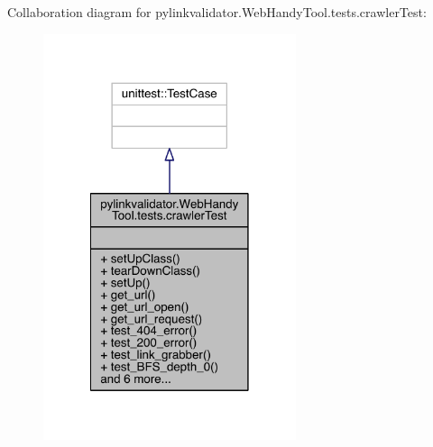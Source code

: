 Collaboration diagram for pylinkvalidator.\+Web\+Handy\+Tool.\+tests.\+crawler\+Test\+:
\nopagebreak
\begin{figure}[H]
\begin{center}
\leavevmode
\includegraphics[width=210pt]{classpylinkvalidator_1_1_web_handy_tool_1_1tests_1_1crawler_test__coll__graph}
\end{center}
\end{figure}
